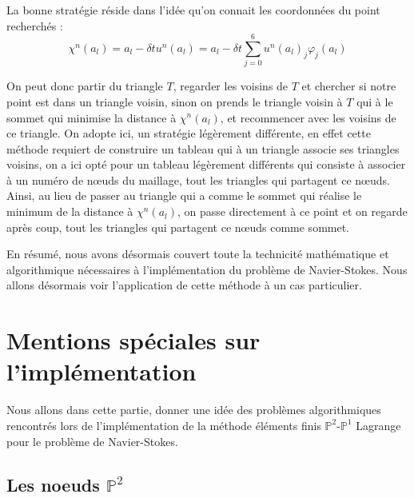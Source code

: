 \documentclass[a4paper,12pt]{article}
\begin{document}
La bonne stratégie réside dans l'idée qu'on connait les coordonnées du point recherchés : 
\begin{equation}
\chi^n (a_l) = a_l -\delta t u^n \left( a_l \right) = a_l -\delta t \sum_{j = 0}^6 u^n \left( a_l \right)_j \varphi_j \left( a_l \right)
\end{equation}

On peut donc partir du triangle $T$, regarder les voisins de $T$ et chercher si notre point est dans un triangle voisin, sinon on prends le triangle voisin à $T$ qui à le sommet qui minimise la distance à $\chi^n (a_l)$, et recommencer avec les voisins de ce triangle. On adopte ici, un stratégie légèrement différente, en effet cette méthode requiert de construire un tableau qui à un triangle associe ses triangles voisins, on a ici opté pour un tableau légèrement différents qui consiste à associer à un numéro de nœuds du maillage, tout les triangles qui partagent ce nœuds. Ainsi, au lieu de passer au triangle qui a comme le sommet qui réalise le minimum de la distance à $\chi^n (a_l)$, on passe directement à ce point et on regarde après coup, tout les triangles qui partagent ce nœuds comme sommet.

En résumé, nous avons désormais couvert toute la technicité mathématique et algorithmique nécessaires à l'implémentation du problème de Navier-Stokes. Nous allons désormais voir l'application de cette méthode à un cas particulier.

\newpage

\section{Mentions spéciales sur l'implémentation}

Nous allons dans cette partie, donner une idée des problèmes algorithmiques rencontrés lors de l'implémentation de la méthode éléments finis $\mathbb{P}^2$-$\mathbb{P}^1$ Lagrange pour le problème de Navier-Stokes.

\subsection{Les noeuds $\mathbb{P}^2$}
\end{document}
